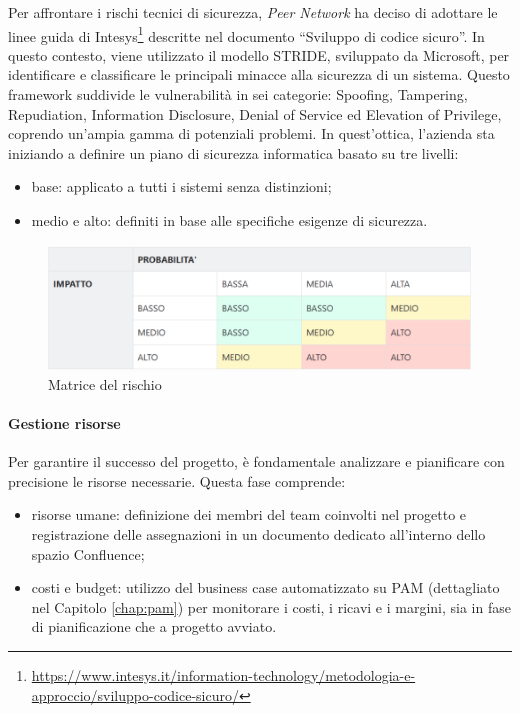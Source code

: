             Per affrontare i rischi tecnici di sicurezza, \textit{Peer Network} ha deciso di adottare le linee guida di Intesys\footnote{\url{https://www.intesys.it/information-technology/metodologia-e-approccio/sviluppo-codice-sicuro/}}
            descritte nel documento “Sviluppo di codice sicuro”. In questo contesto, viene utilizzato il modello STRIDE,
            sviluppato da Microsoft, per identificare e classificare le principali minacce alla sicurezza di un sistema.
            Questo framework suddivide le vulnerabilità in sei categorie: Spoofing, Tampering, Repudiation, Information
            Disclosure, Denial of Service ed Elevation of Privilege, coprendo un’ampia gamma di potenziali problemi.
            In quest’ottica, l’azienda sta iniziando a definire un piano di sicurezza informatica basato su tre livelli:
            \begin{itemize}
                \item base: applicato a tutti i sistemi senza distinzioni;
                \item medio e alto: definiti in base alle specifiche esigenze di sicurezza.
            \end{itemize}

            \begin{figure}
                \centering
                \includegraphics[scale=0.5]{figures/riskMatrix.png}
                \caption{Matrice del rischio}
                \label{fig:risk-matrix}
            \end{figure}

            \paragraph{Gestione risorse}
            Per garantire il successo del progetto, è fondamentale analizzare e pianificare con precisione le risorse necessarie. Questa fase comprende:
            \begin{itemize}
                \item risorse umane: definizione dei membri del team coinvolti nel progetto e registrazione delle assegnazioni in un documento dedicato all'interno dello spazio Confluence;
                \item costi e budget: utilizzo del business case automatizzato su \ac{PAM} (dettagliato nel Capitolo \ref{chap:pam}) per monitorare i costi,
                i ricavi e i margini, sia in fase di pianificazione che a progetto avviato.
            \end{itemize}

